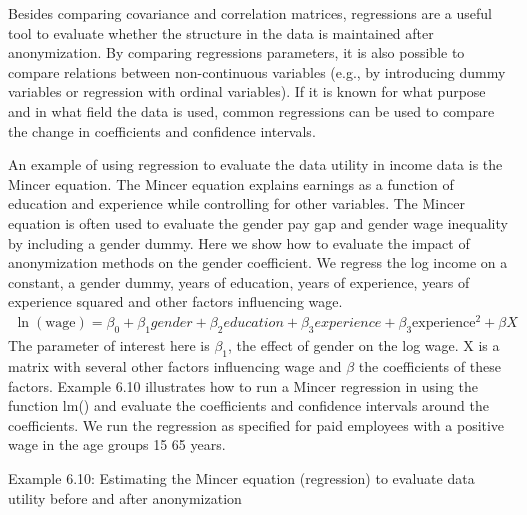 \documentclass[letterpaper,10pt,english]{sphinxmanual}
\begin{document}
Besides comparing covariance and correlation matrices, regressions are a
useful tool to evaluate whether the structure in the data is maintained
after anonymization. By comparing regressions parameters, it is also
possible to compare relations between non-continuous variables (e.g., by
introducing dummy variables or regression with ordinal variables). If it
is known for what purpose and in what field the data is used, common
regressions can be used to compare the change in coefficients and
confidence intervals.

An example of using regression to evaluate the data utility in income
data is the Mincer equation. The Mincer equation explains earnings as a
function of education and experience while controlling for other
variables. The Mincer equation is often used to evaluate the gender pay
gap and gender wage inequality by including a gender dummy. Here we show
how to evaluate the impact of anonymization methods on the gender
coefficient. We regress the log income on a constant, a gender dummy,
years of education, years of experience, years of experience squared and
other factors influencing wage.
\begin{equation*}
\begin{split}\ln\left( \text{wage} \right) = \beta_{0} + \beta_{1}gender + \beta_{2}education + \beta_{3}experience + \beta_{3}\text{experience}^{2} + \beta X\end{split}
\end{equation*}
The parameter of interest here is \(\beta_{1}\), the effect of
gender on the log wage. X is a matrix with several other factors
influencing wage and \(\beta\) the coefficients of these factors.
Example 6.10 illustrates how to run a Mincer regression in  using the
function lm() and evaluate the coefficients and confidence intervals
around the coefficients. We run the regression as specified for paid
employees with a positive wage in the age groups 15 \textendash{} 65 years.

Example 6.10: Estimating the Mincer equation (regression) to evaluate
data utility before and after anonymization
\end{document}
